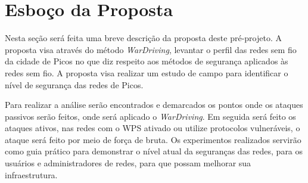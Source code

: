 \documentclass[
	article,			%
	11pt,				%
	oneside,			%
	a4paper,			%
	english,			%
	brazil,				%
	sumario=tradicional
	]{abntex2}
\begin{document}
\begin{table}[h]
\caption{Comparação de trabalhos a partir dos modelos, diferenciando os objetivos e métodos de ataque.}
\end{table}

\section{Esboço da Proposta}
Nesta seção será feita uma breve descrição da proposta deste pré-projeto. A proposta visa através do método \textit{WarDriving}, levantar o perfil das redes sem fio da cidade de Picos no que diz respeito aos métodos de segurança aplicados às redes sem fio. A proposta visa realizar um estudo de campo para identificar o nível de segurança das redes de Picos.  

Para realizar a análise serão encontrados e demarcados os pontos onde os ataques passivos serão feitos, onde será aplicado o \textit{WarDriving}. Em seguida será feito os ataques ativos, nas redes com o WPS ativado ou utilize protocolos vulneráveis, o ataque será feito por meio de força de bruta. Os experimentos realizados servirão como guia prático para demonstrar o nível atual da seguranças das redes, para os usuários e administradores de redes, para que possam melhorar sua infraestrutura. 
\end{document}
